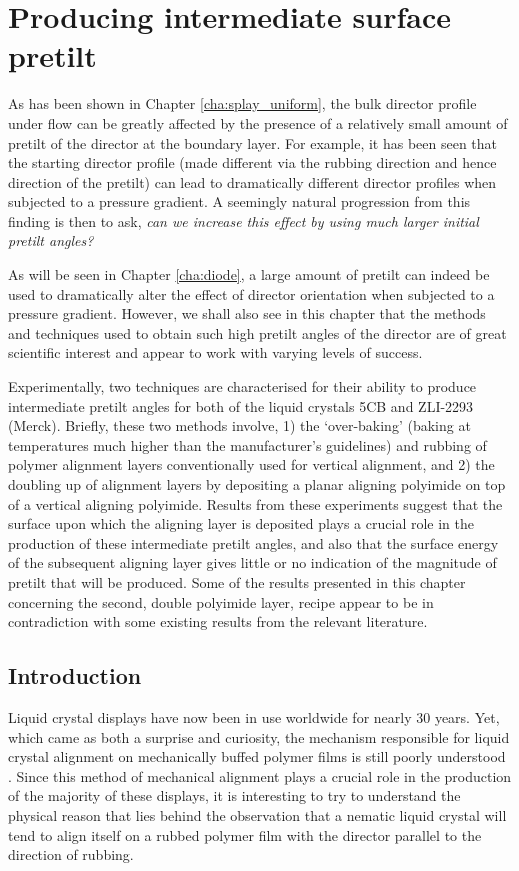 \section{Producing intermediate surface pretilt}
\label{cha:pretilt}
As has been shown in Chapter \ref{cha:splay_uniform}, the bulk director profile under flow can be greatly affected by the presence of a relatively small amount of pretilt of the director at the boundary layer. For example, it has been seen that the starting director profile (made different via the rubbing direction and hence direction of the pretilt) can lead to dramatically different director profiles when subjected to a pressure gradient. A seemingly natural progression from this finding is then to ask, \textit{can we increase this effect by using much larger initial pretilt angles?} 

As will be seen in Chapter \ref{cha:diode}, a large amount of pretilt can indeed be used to dramatically alter the effect of director orientation when subjected to a pressure gradient. However, we shall also see in this chapter that the methods and techniques used to obtain such high pretilt angles of the director are of great scientific interest and appear to work with varying levels of success.

Experimentally, two techniques are characterised for their ability to produce intermediate pretilt angles for both of the liquid crystals 5CB and ZLI-2293 (Merck). Briefly, these two methods involve, 1) the `over-baking' (baking at temperatures much higher than the manufacturer's guidelines) and rubbing of polymer alignment layers conventionally used for vertical alignment, and 2) the doubling up of alignment layers by depositing a planar aligning polyimide on top of a vertical aligning polyimide. Results from these experiments suggest that the surface upon which the aligning layer is deposited plays a crucial role in the production of these intermediate pretilt angles, and also that the surface energy of the subsequent aligning layer gives little or no indication of the magnitude of pretilt that will be produced. Some of the results presented in this chapter concerning the second, double polyimide layer, recipe appear to be in contradiction with some existing results from the relevant literature.

\subsection{Introduction}
\label{sec:pretilt_introduction}
Liquid crystal displays have now been in use worldwide for nearly 30 years. Yet, which came as both a surprise and curiosity, the mechanism responsible for liquid crystal alignment on mechanically buffed polymer films is still poorly understood \citep{Kumar2005}. Since this method of mechanical alignment plays a crucial role in the production of the majority of these displays, it is interesting to try to understand the physical reason that lies behind the observation that a nematic liquid crystal will tend to align itself on a rubbed polymer film with the director parallel to the direction of rubbing.

